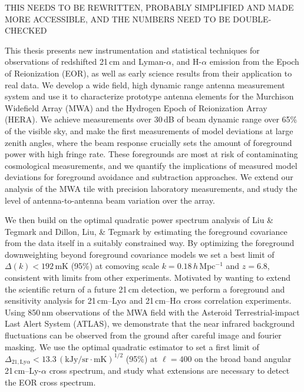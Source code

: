 % 
% 
%

THIS NEEDS TO BE REWRITTEN, PROBABLY SIMPLIFIED AND MADE MORE ACCESSIBLE, AND THE NUMBERS NEED TO BE DOUBLE-CHECKED

This thesis presents new instrumentation and statistical techniques for observations of redshifted 21\,cm and Lyman-$\alpha$, and H-$\alpha$  emission from the Epoch of Reionization (EOR), as well as early science results from their application to real data. We develop a wide field, high dynamic range antenna measurement system and use it to characterize prototype antenna elements for the Murchison Widefield Array (MWA) and the Hydrogen Epoch of Reionization Array (HERA). We achieve measurements over 30\,dB of beam dynamic range over 65\% of the visible sky, and make the first measurements of model deviations at large zenith angles, where the beam response crucially sets the amount of foreground power with high fringe rate. These foregrounds are most at risk of contaminating cosmological measurements, and we quantify the implications of measured model deviations for foreground avoidance and subtraction approaches. We extend our analysis of the MWA tile with precision laboratory measurements, and study the level of antenna-to-antenna beam variation over the array. 

We then build on the optimal quadratic power spectrum analysis of Liu \& Tegmark and Dillon, Liu, \& Tegmark by estimating the foreground covariance from the data itself in a suitably constrained way. By optimizing the foreground downweighting beyond foreground covariance models we set a best limit of $\Delta(k) < 192$\,mK (95\%) at comoving scale $k = 0.18$\,$h$\,Mpc$^{-1}$ and $z = 6.8$, consistent with limits from other experiments. Motivated by wanting to extend the scientific return of a future 21\,cm detection, we perform a foreground and sensitivity analysis for 21\,cm--Ly$\alpha$ and 21\,cm--H$\alpha$ cross correlation experiments. Using 850\,nm observations of the MWA field with the Asteroid Terrestrial-impact Last Alert System (ATLAS), we demonstrate that the near infrared background fluctuations can be observed from the ground after careful image and fourier masking. We use the optimal quadratic estimator to set a first limit of $\Delta_{21,\text{Ly}\alpha}<13.3\,(\text{kJy/sr}\cdot \text{mK})^{1/2}$ (95\%) at $\ell=400$  on the broad band angular 21\,cm--Ly-$\alpha$ cross spectrum, and study what extensions are necessary to detect the EOR cross spectrum.
